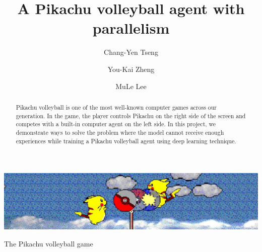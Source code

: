 \documentclass[sigconf]{acmart}
\begin{document}
\title{A Pikachu volleyball agent with parallelism}

\author{Chang-Yen Tseng}

\author{You-Kai Zheng}

\author{MuLe Lee}

\begin{abstract}
  Pikachu volleyball is one of the most well-known computer games across our generation. In the game, the player controls Pikachu on the right side of the screen and competes with a built-in computer agent on the left side. In this project, we demonstrate ways to solve the problem where the model cannot receive enough experiences while training a Pikachu volleyball agent using deep learning technique.
\end{abstract}


\begin{teaserfigure}
  \includegraphics[width=\textwidth]{teaser}
  \caption{The Pikachu volleyball game}
  \label{fig:teaser}
\end{teaserfigure}

\maketitle
\end{document}
